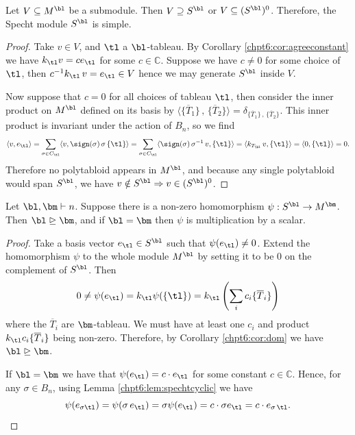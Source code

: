 \documentclass[11pt]{report}
\begin{document}
\begin{thm}
	Let $V \subseteq M^{\bl}$ be a submodule. Then $V \supseteq S^{\bl}$ or $V \subseteq (S^{\bl})^{0}$. Therefore, the Specht module $S^{\bl}$ is simple.
\end{thm}
\begin{proof}
	Take $v \in V$, and $\tl$ a $\bl$-tableau. By Corollary \ref{chpt6:cor:agreeconstant} we have $k_{\tl} v = c e_{\tl}$ for some $c\in\mathbb{C}$. Suppose we have $c\neq 0$ for some choice of  $\tl$, then $c^{-1} k_{\tl} \,v = e_{\tl} \in V$ hence we may generate $S^{\bl}$ inside $V$.
	
	Now suppose that $c = 0$ for all choices of tableau $\tl$, then consider the inner product on $M^{\bl}$ defined on its basis by $\langle \{\overline{T}_{1} \} \,, \, \{\overline{T}_{2} \} \rangle = \delta_{\{\overline{T}_{1} \} \,, \, \{\overline{T}_{2} \}}$. This inner product is invariant under the action of $B_{n}$, so we find
	\[\langle v, e_{\tl} \rangle = \sum_{\sigma \in C_{\tl}} \langle v, \sign(\sigma) \, \sigma \, \{\tl\} \rangle = \sum_{\sigma \in C_{\tl}} \langle \sign(\sigma) \, \sigma^{-1} \, v, \{\tl\} \rangle =  \langle k_{T_{\bl}} \,v , \{\tl\} \rangle= \langle 0, \{\tl\} \rangle= 0.\]
	Therefore no polytabloid appears in $M^{\bl}$, and because any single polytabloid would span $S^{\bl}$, we have $v \notin S^{\bl} \Rightarrow v \in (S^{\bl})^{0}$. 
	
\end{proof}

\begin{thm}
	\label{chpt6:thm:noniso}
	Let $\bl,\bm \vdash n$. Suppose there is a non-zero homomorphism $\psi: S^{\bl} \to M^{\bm}$. Then $\bl \trianglerighteq \bm$, and if $\bl = \bm$ then $\psi$ is multiplication by a scalar.
\end{thm}

\begin{proof}
	Take a basis vector $e_{\tl} \in S^{\bl}$ such that $\psi(e_{\tl}) \neq 0$. Extend the homomorphism $\psi$ to the whole module $M^{\bl}$ by setting it to be $0$ on the complement of $S^{\bl}$. Then
	\[0 \neq \psi(e_{\tl}) = k_{\tl} \psi( \{\tl\}) = k_{\tl} \left( \sum_{i} c_{i} \{\overline{T}_{i}\} \right) \]
	where the $\overline{T}_{i}$ are $\bm$-tableau. We must have at least one $c_{i}$ and product $k_{\tl} c_{i} \{\overline{T}_{i}\}$ being non-zero. Therefore, by Corollary \ref{chpt6:cor:dom} we have $\bl \trianglerighteq \bm$. 
	
	If $\bl = \bm$ we have that $\psi(e_{\tl}) = c \cdot e_{\tl}$ for some constant $c \in \mathbb{C}$. Hence, for any $\sigma \in B_{n}$, using Lemma \ref{chpt6:lem:spechtcyclic} we have
	\[\psi(e_{\sigma \tl}) = \psi( \sigma \, e_{\tl}) = \sigma \psi(e_{\tl}) = c\cdot \sigma e_{\tl} = c\cdot e_{\sigma \, \tl}. \qedhere\]
\end{proof}
\end{document}
